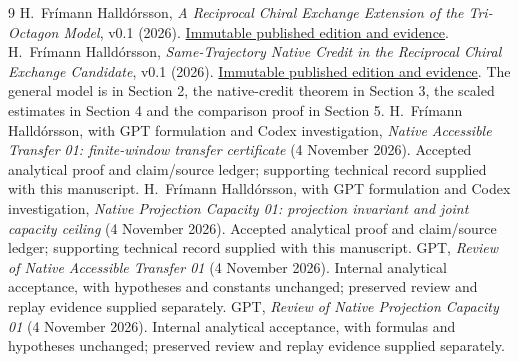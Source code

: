 \begin{thebibliography}{9}
H.~Fr\'imann Halld\'orsson,
\emph{A Reciprocal Chiral Exchange Extension of the Tri-Octagon Model},
v0.1 (2026).
\href{https://github.com/pzychozen/trioctagon-physics/tree/273b1a6faaab19ea58748d00576439166eeef9ab/papers/RECIPROCAL_CHIRAL_EXCHANGE/publication/v0.1}{Immutable published edition and evidence}.
H.~Fr\'imann Halld\'orsson,
\emph{Same-Trajectory Native Credit in the Reciprocal Chiral Exchange Candidate},
v0.1 (2026).
\href{https://github.com/pzychozen/trioctagon-physics/tree/28e8a85c8fe1e6321328d4d7285b2560d1f98aa9/papers/SAME_TRAJECTORY_NATIVE_CREDIT/publication/v0.1}{Immutable published edition and evidence}.
The general model is in Section 2, the native-credit theorem in Section 3,
the scaled estimates in Section 4 and the comparison proof in Section 5.
H.~Fr\'imann Halld\'orsson, with GPT formulation and Codex investigation,
\emph{Native Accessible Transfer 01: finite-window transfer certificate}
(4 November 2026).
Accepted analytical proof and claim/source ledger; supporting technical record supplied with this manuscript.
H.~Fr\'imann Halld\'orsson, with GPT formulation and Codex investigation,
\emph{Native Projection Capacity 01: projection invariant and joint capacity ceiling}
(4 November 2026).
Accepted analytical proof and claim/source ledger; supporting technical record supplied with this manuscript.
GPT, \emph{Review of Native Accessible Transfer 01}
(4 November 2026).
Internal analytical acceptance, with hypotheses and constants unchanged; preserved review and replay evidence supplied separately.
GPT, \emph{Review of Native Projection Capacity 01}
(4 November 2026).
Internal analytical acceptance, with formulas and hypotheses unchanged; preserved review and replay evidence supplied separately.
\end{thebibliography}
